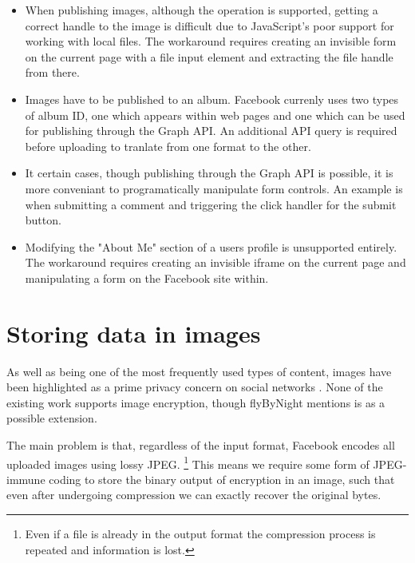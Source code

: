 \begin{itemize}

    \item When publishing images, although the operation is supported, getting a correct handle to the image is difficult due to JavaScript's poor support for working with local files. The workaround requires creating an invisible form on the current page with a file input element and extracting the file handle from there.

    \item Images have to be published to an album. Facebook currenly uses two types of album ID, one which appears within web pages and one which can be used for publishing through the Graph API. An additional API query is required before uploading to tranlate from one format to the other.
    
    \item It certain cases, though publishing through the Graph API is possible, it is more conveniant to programatically manipulate form controls. An example is when submitting a comment and triggering the click handler for the submit button.
    
    \item Modifying the "About Me" section of a users profile is unsupported entirely. The workaround requires creating an invisible iframe on the current page and manipulating a form on the Facebook site within.

\end{itemize}

    
\FloatBarrier
\section{Storing data in images}

As well as being one of the most frequently used types of content, images have been highlighted as a prime privacy concern on social networks \cite{fb-images}. None of the existing work supports image encryption, though flyByNight mentions is as a possible extension.

The main problem is that, regardless of the input format, Facebook encodes all uploaded images using lossy JPEG. \footnote{Even if a file is already in the output format the compression process is repeated and information is lost.} This means we require some form of JPEG-immune coding to store the binary output of encryption in an image, such that even after undergoing compression we can exactly recover the original bytes.

